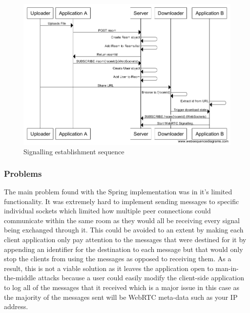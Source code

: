 \documentclass[]{report}
\begin{document}
				\begin{figure}[H]
					\caption{Signalling establishment sequence}
					\centering
					\includegraphics[scale=0.5]{signalling-establishment-sequence.png}
				\end{figure}
							
				\subsubsection{Problems}
				The main problem found with the Spring implementation was in it's limited functionality. It was extremely hard to implement sending messages to specific individual sockets which limited how multiple peer connections could communicate within the same room as they would all be receiving every signal being exchanged through it. This could be avoided to an extent by making each client application only pay attention to the messages that were destined for it by appending an identifier for the destination to each message but that would only stop the clients from using the messages as opposed to receiving them. As a result, this is not a viable solution as it leaves the application open to man-in- the-middle attacks because a user could easily modify the client-side application to log all of the messages that it received which is a major issue in this case as the majority of the messages sent will be WebRTC meta-data such as your IP address.
				
\end{document}
